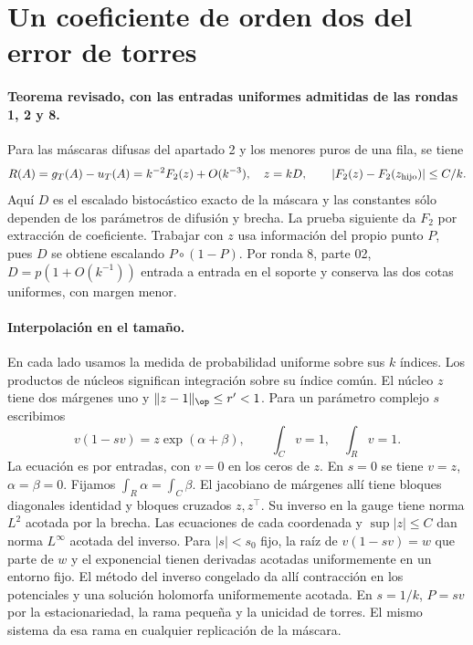 \section{Un coeficiente de orden dos del error de torres}
\paragraph{Teorema revisado, con las entradas uniformes admitidas de las rondas 1, 2 y 8.}
Para las máscaras difusas del apartado 2 y los menores puros de una fila, se tiene
\[
 R(A)=g_T(A)-u_T(A)=k^{-2}F_2(z)+O(k^{-3}),\quad z=kD,
 \qquad |F_2(z)-F_2(z_{\rm hijo})|\le C/k .
\]
Aquí $D$ es el escalado bistocástico exacto de la máscara y las constantes sólo
dependen de los parámetros de difusión y brecha. La prueba siguiente da $F_2$ por extracción
de coeficiente. Trabajar con $z$ usa información del propio punto $P$, pues $D$
se obtiene escalando $P\circ(1-P)$. Por ronda 8, parte 02, $D=p(1+O(k^{-1}))$
entrada a entrada en el soporte y conserva las dos cotas uniformes, con margen menor.
\paragraph{Interpolación en el tamaño.}
En cada lado usamos la medida de probabilidad uniforme sobre sus $k$ índices.
Los productos de núcleos significan integración sobre su índice común. El núcleo $z$
tiene dos márgenes uno y $\|z-1\|_{\op}\le r'<1$. Para un parámetro complejo $s$ escribimos
\[
 v(1-sv)=z\exp(\alpha+\beta),\qquad \int_C v=1,\quad\int_R v=1 .
\]
La ecuación es por entradas, con $v=0$ en los ceros de $z$. En $s=0$ se tiene
$v=z$, $\alpha=\beta=0$. Fijamos $\int_R\alpha=\int_C\beta$. El jacobiano de márgenes
allí tiene bloques diagonales identidad y bloques cruzados $z,z^\top$.
Su inverso en la gauge tiene norma $L^2$ acotada por la brecha. Las ecuaciones
de cada coordenada y $\sup|z|\le C$ dan norma $L^\infty$ acotada del inverso.
Para $|s|<s_0$ fijo, la raíz de $v(1-sv)=w$ que parte de $w$ y el exponencial
tienen derivadas acotadas uniformemente en un entorno fijo. El método del inverso
congelado da allí contracción en los potenciales y una solución holomorfa uniformemente acotada.
En $s=1/k$, $P=sv$ por la estacionariedad, la rama pequeña y la unicidad de torres.
El mismo sistema da esa rama en cualquier replicación de la máscara.
